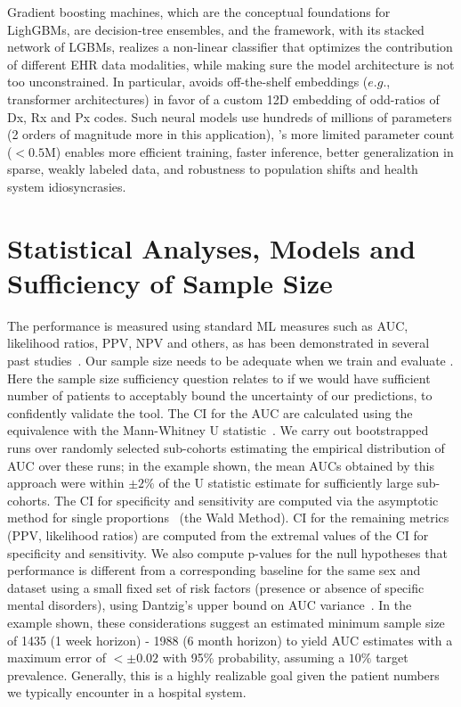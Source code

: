 Gradient boosting machines, which are the conceptual foundations for LighGBMs,  are decision-tree ensembles, and the \zcor framework, with its stacked network of LGBMs, realizes a non-linear classifier that optimizes the contribution of different EHR data modalities, while making sure the model architecture is not too unconstrained.  In particular, \zcor  avoids off-the-shelf embeddings ($e.g.$, transformer architectures) in favor of a custom 12D embedding of odd-ratios of Dx, Rx and Px codes. Such  neural models  use hundreds of millions of parameters (2 orders of magnitude more  in this application), \zcor’s more limited parameter count ($<0.5$M) enables  more efficient training, faster inference, better generalization in sparse, weakly labeled data, and robustness to population shifts and health system idiosyncrasies.




\section*{Statistical Analyses, Models and Sufficiency of Sample Size} The \zcor performance is measured using standard ML measures such as AUC, likelihood ratios, PPV, NPV and others, as has been demonstrated in several past studies~\cite{onishchenko2021reduced,onishchenko2022screening,JAHA2022}. %
%
Our sample size needs to be adequate when we train and evaluate \zcor . Here the sample size sufficiency question relates to if we would have sufficient number of patients to acceptably bound the uncertainty of our predictions, to confidently validate the tool. The CI for the  AUC are calculated using  the  equivalence with the Mann-Whitney U statistic~\cite{birnbaum1957bounds,mann1947test,wilcoxon1992individual}. We 
carry out bootstrapped runs over randomly selected sub-cohorts   estimating the empirical distribution of AUC over these runs; in the example shown, the mean AUCs obtained by this approach were within $\pm 2\%$ of the U statistic estimate for sufficiently large sub-cohorts. The CI for specificity and sensitivity are computed via  the asymptotic method for single proportions~\cite{newcombe1994confidence} (the Wald Method). CI for the remaining metrics (PPV, likelihood ratios) are computed from the extremal values of the CI for specificity and sensitivity. We also compute p-values for the null hypotheses that \pcor performance is different from a corresponding baseline for the same sex and dataset using a small fixed set of risk factors (presence or absence of specific mental disorders), using Dantzig's upper bound on AUC variance~\cite{birnbaum2020use,vandantzig1951consistency}.
 In the example shown, these considerations suggest an estimated minimum sample size 
 of  1435 (1 week horizon) -  1988 (6 month horizon) 
 to yield AUC estimates with a maximum error of $<\pm 0.02$ with 95\% probability, assuming a $10\%$ target prevalence. Generally, this is a highly realizable goal given the patient numbers we typically encounter in a hospital system.


